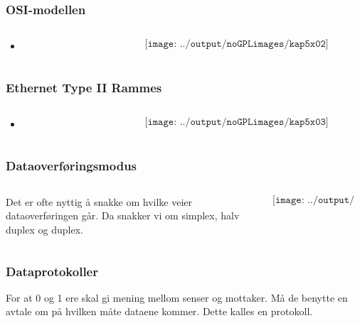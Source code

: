 \documentclass[aspectratio=169,xcolor=dvipsnames]{beamer}
\begin{document}
\begin{frame}
	\frametitle{OSI-modellen}
	\begin{columns}
		\begin{column}{0.5\textwidth}

			\begin{itemize}
				\item      
			\end{itemize}

			
		\end{column}

		\begin{column}{0.5\textwidth}
	$$\texttt{[image: ../output/noGPLimages/kap5x02]}$$
		\end{column}
	\end{columns}
\end{frame}
\begin{frame}
	\frametitle{Ethernet Type II Rammes}
	\begin{columns}
		\begin{column}{0.5\textwidth}

			\begin{itemize}
				\item      
			\end{itemize}

			
		\end{column}

		\begin{column}{0.5\textwidth}
	$$\texttt{[image: ../output/noGPLimages/kap5x03]}$$
		\end{column}
	\end{columns}
\end{frame}
\begin{frame}
	\frametitle{Dataoverføringsmodus}
	\begin{columns}
		\begin{column}{0.5\textwidth}

Det er ofte nyttig å snakke om hvilke veier dataoverføringen går. Da snakker vi om simplex, halv duplex og duplex.

			
		\end{column}

		\begin{column}{0.5\textwidth}
	$$\texttt{[image: ../output/noGPLimages/kap5x04]}$$
		\end{column}
	\end{columns}
\end{frame}
\begin{frame}
	\frametitle{Dataprotokoller}

For at 0 og 1 ere skal gi mening mellom senser og mottaker. Må de benytte en avtale om på hvilken måte dataene kommer. Dette kalles en protokoll. 
	
\end{frame}
\end{document}
